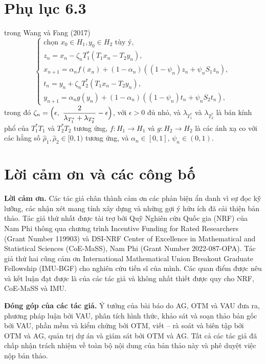 \documentclass[11pt,a4paper]{article}
\theoremstyle{plain}
\theoremstyle{definition}
\theoremstyle{remark}
\numberwithin{equation}{section}
\begin{document}
\section*{Phụ lục 6.3}

trong Wang và Fang (2017)
\[
\begin{cases}
\text{chọn } x_0\in H_1, y_0\in H_2 \text{ tùy ý},\\
z_n=x_n-\zeta_n T_1^{*}(T_1x_n-T_2y_n),\\
x_{n+1}=\alpha_n f(x_n)+(1-\alpha_n)((1-\psi_n)z_n+\psi_n S_1z_n),\\
t_n=y_n+\zeta_n T_2^{*}(T_1x_n-T_2y_n),\\
y_{n+1}=\alpha_n g(y_n)+(1-\alpha_n)((1-\psi_n)t_n+\psi_n S_2t_n),
\end{cases}
\]
trong đó $\zeta_n=\Bigl(\epsilon,\ \dfrac{2}{\lambda_{T_1^{*}}+\lambda_{T_2^{*}}}-\epsilon\Bigr)$, với $\epsilon>0$ đủ nhỏ, và $\lambda_{T_1^{*}}$ và $\lambda_{T_2^{*}}$ là bán kính phổ của $T_1^{*}T_1$ và $T_2^{*}T_2$ tương ứng, $f:H_1\to H_1$ và $g:H_2\to H_2$ là các ánh xạ co với các hằng số $\hat{\rho}_1,\hat{\rho}_2\in[0,1)$ tương ứng, và $\alpha_n\in[0,1]$, $\psi_n\in(0,1)$.

\section*{Lời cảm ơn và các công bố}

\noindent\textbf{Lời cảm ơn.} Các tác giả chân thành cảm ơn các phản biện ẩn danh vì sự đọc kỹ lưỡng, các nhận xét mang tính xây dựng và những gợi ý hữu ích đã cải thiện bản thảo. Tác giả thứ nhất được tài trợ bởi Quỹ Nghiên cứu Quốc gia (NRF) của Nam Phi thông qua chương trình Incentive Funding for Rated Researchers (Grant Number 119903) và DSI-NRF Center of Excellence in Mathematical and Statistical Sciences (CoE-MaSS), Nam Phi (Grant Number 2022-087-OPA). Tác giả thứ hai cũng cảm ơn International Mathematical Union Breakout Graduate Fellowship (IMU-BGF) cho nghiên cứu tiến sĩ của mình. Các quan điểm được nêu và kết luận đạt được là của các tác giả và không nhất thiết được quy cho NRF, CoE-MaSS và IMU.

\medskip
\noindent\textbf{Đóng góp của các tác giả.} Ý tưởng của bài báo do AG, OTM và VAU đưa ra, phương pháp luận bởi VAU, phân tích hình thức, khảo sát và soạn thảo bản gốc bởi VAU, phần mềm và kiểm chứng bởi OTM, viết -- rà soát và biên tập bởi OTM và AG, quản trị dự án và giám sát bởi OTM và AG. Tất cả các tác giả đã chấp nhận trách nhiệm về toàn bộ nội dung của bản thảo này và phê duyệt việc nộp bản thảo.
\end{document}
